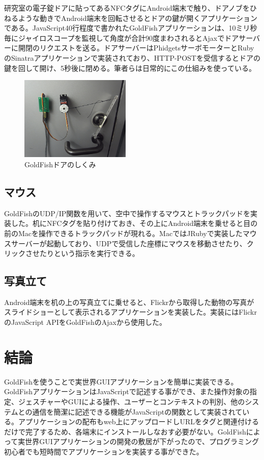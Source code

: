 研究室の電子錠ドアに貼ってあるNFCタグにAndroid端末で触り、ドアノブをひねるような動きでAndroid端末を回転させるとドアの鍵が開くアプリケーションである。JavaScript40行程度で書かれたGoldFishアプリケーションは、10ミリ秒毎にジャイロスコープを監視して角度が合計90度まわされるとAjaxでドアサーバーに開閉のリクエストを送る。ドアサーバーはPhidgetsサーボモーターとRubyのSinatraアプリケーションで実装されており、HTTP-POSTを受信するとドアの鍵を回して開け、5秒後に閉める。筆者らは日常的にこの仕組みを使っている。

\begin{figure}
  \begin{center}
    \includegraphics[height=40mm]{img/door.png}
  \end{center}
  \caption{GoldFishドアのしくみ}
  \label{fig:door}
\end{figure}


\subsection{マウス}
GoldFishのUDP/IP関数を用いて、空中で操作するマウスとトラックパッドを実装した。机にNFCタグを貼り付けておき、その上にAndroid端末を乗せると目の前のMacを操作できるトラックパッドが現れる。MacではJRubyで実装したマウスサーバーが起動しており、UDPで受信した座標にマウスを移動させたり、クリックさせたりという指示を実行できる。


\subsection{写真立て}
Android端末を机の上の写真立てに乗せると、Flickrから取得した動物の写真がスライドショーとして表示されるアプリケーションを実装した。実装にはFlickrのJavaScript APIをGoldFishのAjaxから使用した。


\section{結論}
GoldFishを使うことで実世界GUIアプリケーションを簡単に実装できる。GoldFishアプリケーションはJavaScriptで記述する事ができ、また操作対象の指定、ジェスチャーやGUIによる操作、ユーザーとコンテキストの判別、他のシステムとの通信を簡潔に記述できる機能がJavaScriptの関数として実装されている。アプリケーションの配布もweb上にアップロードしURLをタグと関連付けるだけで完了するため、各端末にインストールしなおす必要がない。GoldFishによって実世界GUIアプリケーションの開発の敷居が下がったので、プログラミング初心者でも短時間でアプリケーションを実装する事ができた。


